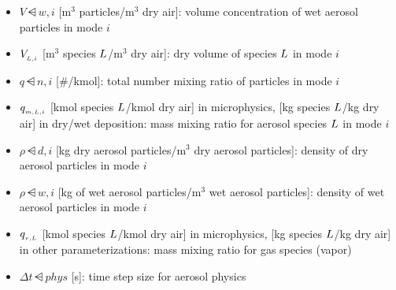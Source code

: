 \begin{itemize}
  \item $V\dsub{w,i}$ [m$^3$ particles/m$^3$ dry air]: volume concentration of
        wet aerosol particles in mode $i$

  \item $V_{_{L,i}}$ [m$^3$ species $L$/m$^3$ dry air]: dry
        volume of species $L$ in mode $i$

  \item $q\dsub{n,i}$ [\#/kmol]: total number mixing ratio of particles in mode
        $i$

  \item $q_{_{m,L,i}}$ [kmol species $L$/kmol dry air] in microphysics,
        [kg species $L$/kg dry air] in dry/wet deposition: mass mixing
        ratio for aerosol species $L$ in mode $i$

  \item $\rho\dsub{d,i}$ [kg dry aerosol particles/m$^3$ dry aerosol particles]:
        density of dry aerosol particles in mode $i$

  \item $\rho\dsub{w,i}$ [kg of wet aerosol particles/m$^3$ wet aerosol
        particles]: density of wet aerosol particles in mode $i$

  \item $q_{_{v,L}}$ [kmol species $L$/kmol dry air] in microphysics,
        [kg species $L$/kg dry air] in other parameterizations: mass
        mixing ratio for gas species (vapor)

  \item $\Delta t\dsub{phys}$ [s]: time step size for aerosol physics
\end{itemize}
